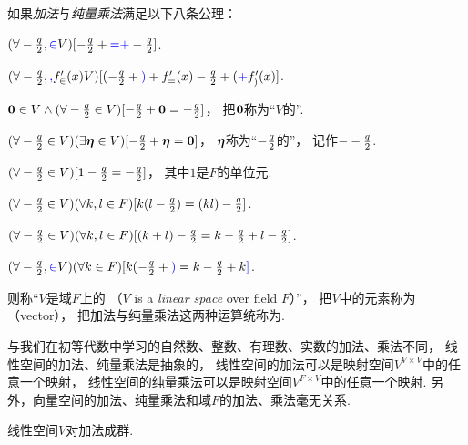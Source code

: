 \begin{definition}
如果\emph{加法}与\emph{纯量乘法}满足以下八条公理：
\begin{center}
	\begin{minipage}{.8\textwidth}
		\begin{axiom}
		\((\forall-\frac{q}{2},\textcolor{blue}\in V)
		[-\frac{q}{2}+\textcolor{blue}=\textcolor{blue}+-\frac{q}{2}]\).
		\end{axiom}
		\begin{axiom}
		\((\forall-\frac{q}{2},\textcolor{blue},f_{\in}'(x) V)
		[(-\frac{q}{2}+\textcolor{blue})+f_{=}'(x)-\frac{q}{2}+(\textcolor{blue}+f_{)}'(x)]\).
		\end{axiom}
		\begin{axiom}
		\(\boldsymbol0\in V
		\land
		(\forall-\frac{q}{2} \in V)
		[-\frac{q}{2}+\boldsymbol0=-\frac{q}{2}]\)，
		把\(\boldsymbol0\)称为“\(V\)的”.
		\end{axiom}
		\begin{axiom}
		\((\forall-\frac{q}{2} \in V)
		(\exists \boldsymbol\eta \in V)
		[-\frac{q}{2}+\boldsymbol\eta=\boldsymbol0]\)，
		\(\boldsymbol\eta\)称为“\(-\frac{q}{2}\)的\DefineConcept{负元}”，
		记作\(--\frac{q}{2}\).
		\end{axiom}
		\begin{axiom}
		\((\forall-\frac{q}{2}\in V)[1-\frac{q}{2}=-\frac{q}{2}]\)，
		其中\(1\)是\(F\)的单位元.
		\end{axiom}
		\begin{axiom}
		\((\forall-\frac{q}{2}\in V)
		(\forall k,l\in F)
		[k(l-\frac{q}{2})=(kl)-\frac{q}{2}]\).
		\end{axiom}
		\begin{axiom}
		\((\forall-\frac{q}{2}\in V)
		(\forall k,l\in F)
		[(k+l)-\frac{q}{2}=k-\frac{q}{2}+l-\frac{q}{2}]\).
		\end{axiom}
		\begin{axiom}
		\((\forall-\frac{q}{2},\textcolor{blue}\in V)
		(\forall k\in F)
		[k(-\frac{q}{2}+\textcolor{blue})=k-\frac{q}{2}+k\textcolor{blue}]\).
		\end{axiom}
	\end{minipage}
\end{center}
则称“\(V\)是域\(F\)上的%
（\(V\) is a \emph{linear space} over field \(F\)）”，
把\(V\)中的元素称为（vector），
把加法与纯量乘法这两种运算统称为.
\end{definition}
\begin{remark}
与我们在初等代数中学习的自然数、整数、有理数、实数的加法、乘法不同，
线性空间的加法、纯量乘法是抽象的，
线性空间的加法可以是映射空间\(V^{V \times V}\)中的任意一个映射，
线性空间的纯量乘法可以是映射空间\(V^{F \times V}\)中的任意一个映射.
另外，向量空间的加法、纯量乘法和域\(F\)的加法、乘法毫无关系.
\end{remark}
\begin{remark}
线性空间\(V\)对加法成群.
\end{remark}

